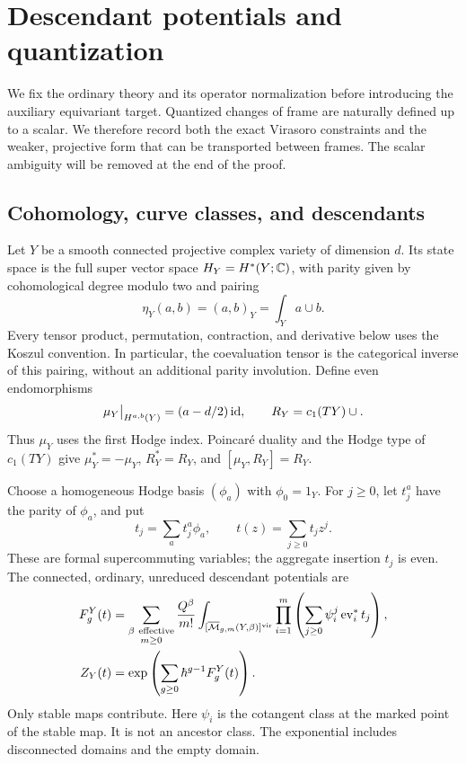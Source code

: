 \section{Descendant potentials and quantization}\label{conv:section}

We fix the ordinary theory and its operator normalization before introducing
the auxiliary equivariant target.  Quantized changes of frame are naturally
defined up to a scalar.  We therefore record both the exact Virasoro
constraints and the weaker, projective form that can be transported between
frames.  The scalar ambiguity will be removed at the end of the proof.

\subsection{Cohomology, curve classes, and descendants}

Let $Y$ be a smooth connected projective complex variety of dimension $d$.
Its state space is the full super vector space
$H_Y=H^*(Y;\mathbb C)$, with parity given by cohomological degree modulo two and
pairing
\[
 \eta_Y(a,b)=(a,b)_Y=\int_Y a\cup b.
\]
Every tensor product, permutation, contraction, and derivative below uses
the Koszul convention.  In particular, the coevaluation tensor is the
categorical inverse of this pairing, without an additional parity
involution.  Define even endomorphisms
\begin{equation}
 \mu_Y\big|_{H^{a,b}(Y)}=(a-d/2)\operatorname{id},
 \qquad R_Y=c_1(TY)\cup.
 \label{conv:grading}
\end{equation}
Thus $\mu_Y$ uses the first Hodge index.  Poincar\'e duality and the Hodge
type of $c_1(TY)$ give
$\mu_Y^*=-\mu_Y$, $R_Y^*=R_Y$, and $[\mu_Y,R_Y]=R_Y$.

Choose a homogeneous Hodge basis $(\phi_a)$ with $\phi_0=1_Y$.
For $j\geq0$, let $t_j^a$ have the parity of $\phi_a$, and put
\[
 t_j=\sum_a t_j^a\phi_a,
 \qquad t(z)=\sum_{j\geq0}t_jz^j.
\]
These are formal supercommuting variables; the aggregate insertion $t_j$
is even.  The connected, ordinary, unreduced descendant potentials are
\begin{equation}
\begin{split}
 F_g^Y(t)
 &=\sum_{\substack{\beta\ \mathrm{effective}\\m\geq0}}
     \frac{Q^\beta}{m!}
     \int_{[\overline{\mathcal M}_{g,m}(Y,\beta)]^{\mathrm{vir}}}
       \prod_{i=1}^{m}
          \left(\sum_{j\geq0}\psi_i^j\operatorname{ev}_i^*t_j\right),\\
 Z_Y(t)&=\exp\left(\sum_{g\geq0}\hbar^{g-1}F_g^Y(t)\right).
\end{split}
\label{conv:potentials}
\end{equation}
Only stable maps contribute.  Here $\psi_i$ is the cotangent class at the
marked point of the stable map.  It is not an ancestor class.
The exponential includes disconnected domains and the empty domain.

